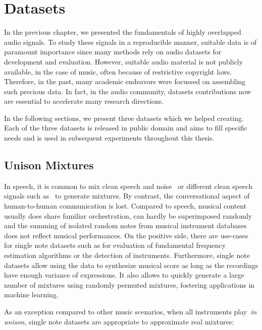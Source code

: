 \chapter{Datasets}
\label{cha:datasets}

In the previous chapter, we presented the fundamentals of highly overlapped audio signals.
To study these signals in a reproducible manner, suitable data is of paramount importance since many methods rely on audio datasets for development and evaluation.
However, suitable audio material is not publicly available, in the case of music, often because of restrictive copyright laws. 
Therefore, in the past, many academic endeavors were focussed on assembling such precious data. 
In fact, in the audio community, datasets contributions now are essential to  accelerate many research directions.
\par
In the following sections, we present three datasets which we helped creating.
Each of the three datasets is released in public domain and aims to fill specific needs and is used in subsequent experiments throughout this thesis.

\section{Unison Mixtures}
\label{sec:unison_dataset}


In speech, it is common to mix clean speech and noise~\cite{varga93} or different clean speech signals such as~\cite{garofolo93} to generate mixtures.
By contrast, the conversational aspect of human-to-human communication is lost.
Compared to speech, musical content usually does share familiar orchestration, can hardly be superimposed randomly and the summing of isolated random notes from musical instrument databases does not reflect musical performances.
On the positive side, there are use-cases for single note datasets such as for evaluation of fundamental frequency estimation algorithms or the detection of instruments.
Furthermore, single note datasets allow using the data to synthesize musical score as long as the recordings have enough variance of expressions.
It also allows to quickly generate a large number of mixtures using randomly permuted mixtures, fostering applications in machine learning.

As an exception compared to other music scenarios, when all instruments play~\emph{in unison}, single note datasets are appropriate to approximate real mixtures:

